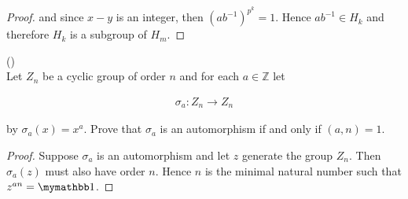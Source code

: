 \documentclass{exam}
\begin{document}
\begin{questions}
\begin{proof}
  and since $x-y$ is an integer, then $(ab^{-1})^{p^k}=1$.  Hence $ab^{-1}\in H_k$ and therefore $H_k$ is a subgroup of $H_m$.
\end{proof}

\vspace{1cm}

\question() \\
Let $Z_n$ be a cyclic group of order $n$ and for each $a\in\mathbb Z$ let

\begin{align*}
  \sigma_a: Z_n\rightarrow Z_n
\end{align*}

by $\sigma_a(x)=x^a$.  Prove that $\sigma_a$ is an automorphism if and only if $(a,n)=1$.

\begin{proof}
  Suppose $\sigma_a$ is an automorphism and let $z$ generate the group $Z_n$.  Then $\sigma_a(z)$ must also have order $n$.  Hence $n$ is the minimal natural number such that $z^{an}=\mymathbb 1$.
\end{proof}

\end{questions}
\end{document}
